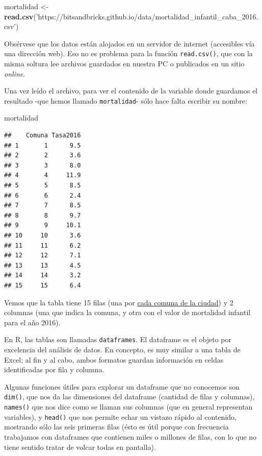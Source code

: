\documentclass[spanish,]{book}
\newenvironment{Shaded}{\begin{snugshade}}{\end{snugshade}}
\newcommand{\KeywordTok}[1]{\textcolor[rgb]{0.13,0.29,0.53}{\textbf{#1}}}
\newcommand{\NormalTok}[1]{#1}
\newcommand{\StringTok}[1]{\textcolor[rgb]{0.31,0.60,0.02}{#1}}
\begin{document}
\begin{Shaded}
\begin{Highlighting}[]
\NormalTok{mortalidad <-}\StringTok{ }\KeywordTok{read.csv}\NormalTok{(}\StringTok{'https://bitsandbricks.github.io/data/mortalidad_infantil_caba_2016.csv'}\NormalTok{)}
\end{Highlighting}
\end{Shaded}

Obsérvese que los datos están alojados en un servidor de internet (accesibles vía una dirección web). Eso no es problema para la función \texttt{read.csv()}, que con la misma soltura lee archivos guardados en nuestra PC o publicados en un sitio \emph{online}.

Una vez leído el archivo, para ver el contenido de la variable donde guardamos el resultado -que hemos llamado \texttt{mortalidad}- sólo hace falta escribir su nombre:

\begin{Shaded}
\begin{Highlighting}[]
\NormalTok{mortalidad}
\end{Highlighting}
\end{Shaded}

\begin{verbatim}
##    Comuna Tasa2016
## 1       1      9.5
## 2       2      3.6
## 3       3      8.0
## 4       4     11.9
## 5       5      8.5
## 6       6      2.4
## 7       7      8.5
## 8       8      9.7
## 9       9     10.1
## 10     10      3.6
## 11     11      6.2
## 12     12      7.1
## 13     13      4.5
## 14     14      3.2
## 15     15      6.4
\end{verbatim}

Vemos que la tabla tiene 15 filas (una por \href{https://es.wikipedia.org/wiki/Comunas_de_la_ciudad_de_Buenos_Aires}{cada comuna de la ciudad}) y 2 columnas (una que indica la comuna, y otra con el valor de mortalidad infantil para el año 2016).

En R, las tablas son llamadas \texttt{dataframes}. El dataframe es el objeto por excelencia del análisis de datos. En concepto, es muy similar a una tabla de Excel; al fin y al cabo, ambos formatos guardan información en celdas identificadas por fila y columna.

Algunas funciones útiles para explorar un dataframe que no conocemos son \texttt{dim()}, que nos da las dimensiones del dataframe (cantidad de filas y columnas), \texttt{names()} que nos dice como se llaman sus columnas (que en general representan variables), y \texttt{head()} que nos permite echar un vistazo rápido al contenido, mostrando sólo las seis primeras filas (ésto es útil porque con frecuencia trabajamos con dataframes que contienen miles o millones de filas, con lo que no tiene sentido tratar de volcar todas en pantalla).
\end{document}
